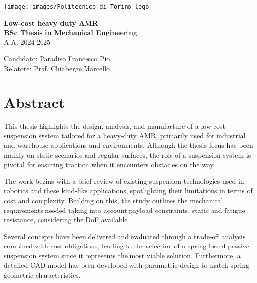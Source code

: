 \documentclass[11pt]{article}
\begin{document}
\thispagestyle{empty}

\begin{flushright}
    \texttt{[image: images/Politecnico di Torino logo]}
\end{flushright}

\vspace*{7cm}

\begin{flushleft}
    {\Huge\bfseries Low-cost heavy duty AMR} \\
    \vspace{0.5cm}
    {\Large\bfseries BSc Thesis in Mechanical Engineering} \\
    \vspace{0.5cm}
    {\large A.A. 2024-2025} \\
    \vspace{1cm}

    {\large Candidato: Paradiso Francesco Pio} \\
    \vspace{0.5cm}
    {\large Relatore: Prof. Chiaberge Marcello} \\
\end{flushleft}

\vfill

\newpage
\thispagestyle{empty}

\section*{Abstract}
This thesis highlights the design, analysis, and manufacture of a low-cost suspension system tailored for a heavy-duty AMR, primarily used for industrial and warehouse applications and environments. Although the thesis focus has been mainly on static scenarios and regular surfaces, the role of a suspension system is pivotal for ensuring traction when it encounters obstacles on the way.

The work begins with a brief review of existing suspension technologies used in robotics and these kind-like applications, spotlighting their limitations in terms of cost and complexity. Building on this, the study outlines the mechanical requirements needed taking into account payload constraints, static and fatigue resistance, considering the DoF available.

Several concepts have been delivered and evaluated through a trade-off analysis combined with cost obligations, leading to the selection of a spring-based passive suspension system since it represents the most viable solution. Furthermore, a detailed CAD model has been developed with parametric design to match spring geometric characteristics.
\end{document}
